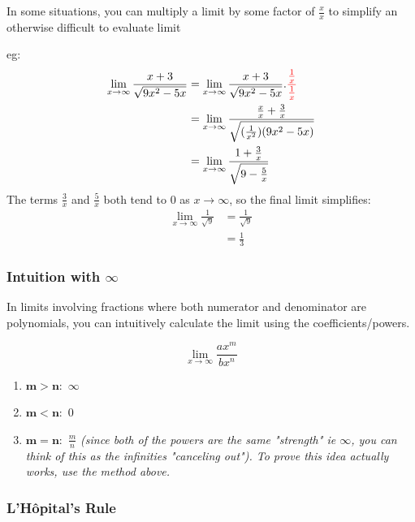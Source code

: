\documentclass[12pt]{article}
\begin{document}
In some situations, you can multiply a limit by some factor of $\frac{x}{x}$ to simplify an otherwise difficult to evaluate limit

eg:
\begin{equation}
\begin{split}
    \lim_{x\to\infty} \frac{x+3}{\sqrt{9x^2-5x}}
     & = \lim_{x\to\infty} \frac{x+3}{\sqrt{9x^2-5x}} . \textcolor{red}{\frac{\frac{1}{x}}{\frac{1}{x}}}\\
     & = \lim_{x\to\infty} \frac{\frac{x}{x}+\frac{3}{x}}{\sqrt{(\frac{1}{x^2})(9x^2-5x)}}\\
     & = \lim_{x\to\infty} \frac{1+\frac{3}{x}}{\sqrt{9-\frac{5}{x}}}
 \end{split}
\end{equation}      
The terms $\frac{3}{x}$ and $\frac{5}{x}$ both tend to $0$ as $x \to \infty$, so the final limit simplifies:
\begin{equation}
\begin{split}
    \lim_{x\to\infty} \frac{1}{\sqrt{9}}
     & = \frac{1}{\sqrt{9}}\\
     & = \frac{1}{3}
 \end{split}
\end{equation}  

\subsubsection{Intuition with \texorpdfstring{$\infty$}{infinity}}

In limits involving fractions where both numerator and denominator are polynomials, you can intuitively calculate the limit using the coefficients/powers.

$$
    \lim_{x\to\infty} \frac{ax^{m}}{bx^n}
$$
\begin{enumerate}
    \item $\mathbf{m > n}:$ $\infty$
    \item $\mathbf{m < n}:$ $0$ 
    \item $\mathbf{m = n}:$  $\frac{m}{n}$ \textit{(since both of the powers are the same "strength" ie $\infty$, you can think of this as the infinities "canceling out"). To prove this idea actually works, use the method above.}
\end{enumerate}

\subsubsection{L'Hôpital's Rule}
\end{document}
